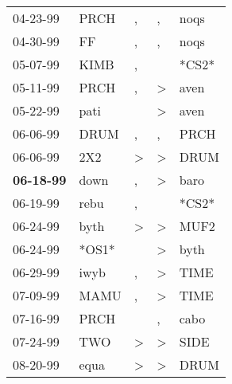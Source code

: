 \begin{supertabular}{p{0.07\textwidth}p{0.06\textwidth}p{0.02\textwidth}p{0.02\textwidth}p{0.06\textwidth}}
          04-23-99\textsuperscript{} &  PRCH\textsuperscript{} &             , &                , &  noqs\textsuperscript{} \\
          04-30-99\textsuperscript{} &    FF\textsuperscript{} &             , &                , &  noqs\textsuperscript{} \\
          05-07-99\textsuperscript{} &  KIMB\textsuperscript{} &             , &                  &                   *CS2* \\
          05-11-99\textsuperscript{} &  PRCH\textsuperscript{} &             , &     \textgreater &  aven\textsuperscript{} \\
          05-22-99\textsuperscript{} &  pati\textsuperscript{} &               &     \textgreater &  aven\textsuperscript{} \\
          06-06-99\textsuperscript{} &  DRUM\textsuperscript{} &             , &                , &  PRCH\textsuperscript{} \\
          06-06-99\textsuperscript{} &   2X2\textsuperscript{} &  \textgreater &     \textgreater &  DRUM\textsuperscript{} \\
 \textbf{06-18-99\textsuperscript{}} &  down\textsuperscript{} &             , &     \textgreater &  baro\textsuperscript{} \\
          06-19-99\textsuperscript{} &  rebu\textsuperscript{} &             , &                  &                   *CS2* \\
          06-24-99\textsuperscript{} &  byth\textsuperscript{} &  \textgreater &     \textgreater &  MUF2\textsuperscript{} \\
          06-24-99\textsuperscript{} &                   *OS1* &               &     \textgreater &  byth\textsuperscript{} \\
          06-29-99\textsuperscript{} &  iwyb\textsuperscript{} &             , &     \textgreater &  TIME\textsuperscript{} \\
          07-09-99\textsuperscript{} &  MAMU\textsuperscript{} &             , &     \textgreater &  TIME\textsuperscript{} \\
          07-16-99\textsuperscript{} &  PRCH\textsuperscript{} &               &                , &  cabo\textsuperscript{} \\
          07-24-99\textsuperscript{} &   TWO\textsuperscript{} &  \textgreater &     \textgreater &  SIDE\textsuperscript{} \\
          08-20-99\textsuperscript{} &  equa\textsuperscript{} &  \textgreater &     \textgreater &  DRUM\textsuperscript{} \\

\end{supertabular}
